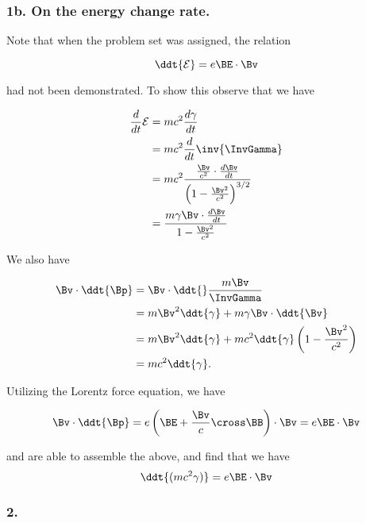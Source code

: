 \subsubsection{1b.  On the energy change rate.}

Note that when the problem set was assigned, the relation

\begin{equation}\label{eqn:relElectroDynProblemSet2:n}
\ddt{\mathcal{E}} = e \BE \cdot \Bv
\end{equation}

had not been demonstrated.  To show this observe that we have

\begin{align*}
\frac{d}{dt} \mathcal{E}
&= m c^2 \frac{d\gamma}{dt} \\
&= m c^2 \frac{d}{dt} \inv{\InvGamma} \\
&= m c^2 \frac{\frac{\Bv}{c^2} \cdot \frac{d\Bv}{dt}}{\left(1 - \frac{\Bv^2}{c^2}\right)^{3/2}} \\
&= \frac{m \gamma \Bv \cdot \frac{d\Bv}{dt}}{1 - \frac{\Bv^2}{c^2}}
\end{align*}

We also have

\begin{align*}
\Bv \cdot \ddt{\Bp} 
&= \Bv \cdot \ddt{} \frac{m \Bv}{\InvGamma} \\
&= m\Bv^2 \ddt{\gamma} + m \gamma \Bv \cdot \ddt{\Bv} \\
&= m\Bv^2 \ddt{\gamma} + m c^2 \ddt{\gamma} \left( 1 - \frac{\Bv^2}{c^2} \right) \\
&= m c^2 \ddt{\gamma}.
\end{align*}

Utilizing the Lorentz force equation, we have

\begin{equation}\label{eqn:relElectroDynProblemSet2:n}
\Bv \cdot \ddt{\Bp} = e \left( \BE + \frac{\Bv}{c} \cross \BB \right) \cdot \Bv = e \BE \cdot \Bv
\end{equation}

and are able to assemble the above, and find that we have
\begin{equation}\label{eqn:relElectroDynProblemSet2:n}
\ddt{(m c^2 \gamma)} = e \BE \cdot \Bv 
\end{equation}

\subsubsection{2.}
